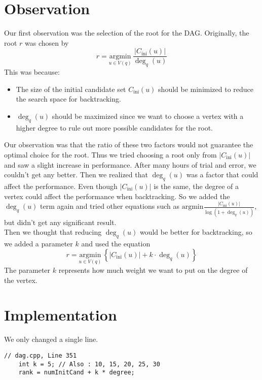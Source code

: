 \documentclass[12pt]{article}
\begin{document}
\section{Observation}
Our first observation was the selection of the root for the DAG. Originally, the root $r$ was chosen by
\begin{equation}
	r =  \underset{u \in V(q)}{\mathrm{argmin}}\, \frac{|C_{\mathrm{ini}}(u)|}{\deg _q (u)}
\end{equation}
This was because:
\begin{itemize}
	\item The size of the initial candidate set $C_{\mathrm{ini}}(u)$ should be minimized to reduce the search space for backtracking.
	\item $\deg_q (u)$ should be maximized since we want to choose a vertex with a higher degree to rule out more possible candidates for the root.
\end{itemize}
Our observation was that the ratio of these two factors would not guarantee the optimal choice for the root. Thus we tried choosing a root only from $|C_{\mathrm{ini}}(u)|$ and saw a slight increase in performance. After many hours of trial and error, we couldn't get any better. Then we realized that $\deg_q(u)$ was a factor that could affect the performance. Even though $|C_{\mathrm{ini}}(u)|$ is the same, the degree of a vertex could affect the performance when backtracking. So we added the $\deg_q(u)$ term again and tried other equations such as $\mathrm{argmin} \frac{|C_{\mathrm{ini}}(u)|}{\log (1+ \deg_q(u))}$, but didn't get any significant result.\\
Then we thought that reducing $\deg_q(u)$ would be better for backtracking, so we added a parameter $k$ and used the equation
\begin{equation}
	r =  \underset{u \in V(q)}{\mathrm{argmin}}\,\left\{ |C_{\mathrm{ini}}(u)| + k \cdot \deg_q(u)\right\}
\end{equation}
The parameter $k$ represents how much weight we want to put on the degree of the vertex.

\section{Implementation}
We only changed a single line.
\begin{lstlisting}[style=Cstyle]
// dag.cpp, Line 351
	int k = 5; // Also : 10, 15, 20, 25, 30
	rank = numInitCand + k * degree;
\end{lstlisting}
\end{document}
